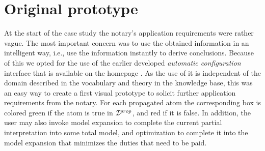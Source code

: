 \section{Original prototype}
\label{original}

At the start of the case study the notary's application requirements were rather vague.
The most important concern was to use the obtained information in an intelligent way, i.e., use the information instantly to derive conclusions.
Because of this we opted for the use of the earlier developed \textit{automatic configuration} interface that is available on the \idp homepage \cite{idphome}.
As the use of it is independent of the domain described in the vocabulary and theory in the knowledge base, this was an easy way to create a first visual prototype to solicit further application requirements from the notary.
For each propagated atom the corresponding box is colored green if the atom is true in $\mathcal{I}^{prop}$, and red if it is false. In addition, the user may also invoke model expansion to complete the current partial interpretation into some total model, and optimization to complete it into the model expansion that minimizes the duties that need to be paid. 

